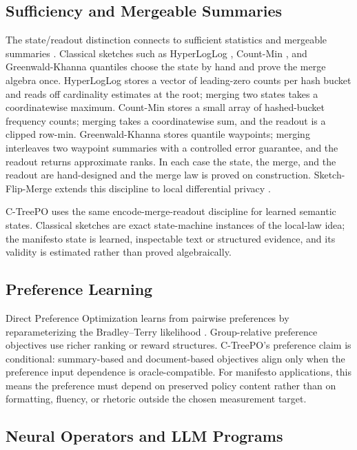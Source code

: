 \subsection{Sufficiency and Mergeable Summaries}

The state/readout distinction connects to sufficient statistics
\citep{Fisher1922,Blackwell1953} and mergeable summaries
\citep{Agarwal2013MergeableTODS}. Classical sketches such as
HyperLogLog \citep{FlajoletEtAl2007}, Count-Min
\citep{CormodeMuthukrishnan2005}, and Greenwald-Khanna quantiles
\citep{GreenwaldKhanna2001} choose the state by hand and prove the
merge algebra once. HyperLogLog stores a vector of leading-zero
counts per hash bucket and reads off cardinality estimates at the
root; merging two states takes a coordinatewise maximum. Count-Min
stores a small array of hashed-bucket frequency counts; merging
takes a coordinatewise sum, and the readout is a clipped row-min.
Greenwald-Khanna stores quantile waypoints; merging interleaves two
waypoint summaries with a controlled error guarantee, and the
readout returns approximate ranks. In each case the state, the
merge, and the readout are hand-designed and the merge law is proved
on construction. Sketch-Flip-Merge extends this discipline to local
differential privacy \citep{HehirTingCormode2023SFM}.

C-TreePO uses the same encode-merge-readout discipline for learned
semantic states. Classical sketches are exact state-machine
instances of the local-law idea; the manifesto state is learned,
inspectable text or structured evidence, and its validity is
estimated rather than proved algebraically.

\subsection{Preference Learning}

Direct Preference Optimization learns from pairwise preferences by
reparameterizing the Bradley--Terry likelihood
\citep{BradleyTerry1952,RafailovEtAl2023DPO}. Group-relative preference
objectives use richer ranking or reward structures. C-TreePO's preference
claim is conditional: summary-based and document-based objectives align only
when the preference input dependence is oracle-compatible. For manifesto
applications, this means the preference must depend on preserved policy
content rather than on formatting, fluency, or rhetoric outside the chosen
measurement target.

\subsection{Neural Operators and LLM Programs}

